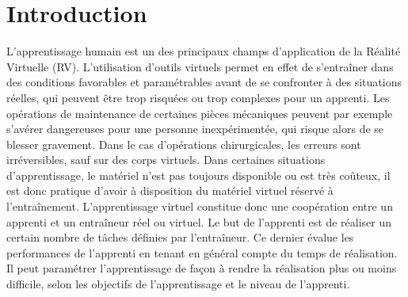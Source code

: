 \documentclass[11pt]{article}
\begin{document}
\section{Introduction}


L'apprentissage humain est un des principaux champs d'application de la Réalité Virtuelle (RV). L'utilisation d'outils virtuels permet en effet de s'entraîner dans des conditions favorables et paramétrables avant de se confronter à des situations réelles, qui peuvent être trop risquées ou trop complexes pour un apprenti. Les opérations de maintenance de certaines pièces mécaniques peuvent par exemple s'avérer dangereuses pour une personne inexpérimentée, qui risque alors de se blesser gravement. Dans le cas d'opérations chirurgicales, les erreurs sont irréversibles, sauf sur des corps virtuels. Dans certaines situations d'apprentissage, le matériel n'est pas toujours disponible ou est très coûteux, il est donc pratique d'avoir à disposition du matériel virtuel réservé à l'entraînement. L'apprentissage virtuel constitue donc une coopération entre un apprenti et un entraîneur réel ou virtuel. Le but de l'apprenti est de réaliser un certain nombre de tâches définies par l'entraîneur. Ce dernier évalue les performances de l'apprenti en tenant en général compte du temps de réalisation. Il peut paramétrer l'apprentissage de façon à rendre la réalisation plus ou moins difficile, selon les objectifs de l'apprentissage et le niveau de l'apprenti.
\\
\end{document}

